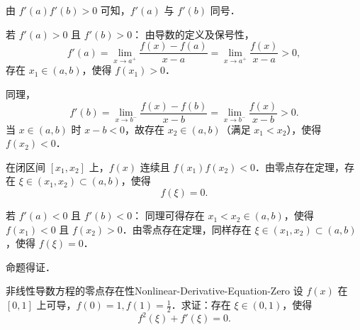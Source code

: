 \begin{myproof}
    由 $f'(a)f'(b) > 0$ 可知，$f'(a)$ 与 $f'(b)$ 同号．

    若 $f'(a) > 0$ 且 $f'(b) > 0$：
    由导数的定义及保号性，
    \begin{equation}
        f'(a) = \lim_{x\to a^+} \frac{f(x) - f(a)}{x - a} = \lim_{x\to a^+} \frac{f(x)}{x - a} > 0,
    \end{equation}
    存在 $x_1 \in (a, b)$，使得 $f(x_1) > 0$．

    同理，
    \begin{equation}
        f'(b) = \lim_{x\to b^-} \frac{f(x) - f(b)}{x - b} = \lim_{x\to b^-} \frac{f(x)}{x - b} > 0.
    \end{equation}
    当 $x \in (a, b)$ 时 $x - b < 0$，故存在 $x_2 \in (a, b)$（满足 $x_1 < x_2$），使得 $f(x_2) < 0$．

    在闭区间 $[x_1, x_2]$ 上，$f(x)$ 连续且 $f(x_1)f(x_2) < 0$．由零点存在定理，存在 $\xi \in (x_1, x_2) \subset (a, b)$，使得
    \begin{equation}
        f(\xi) = 0.
    \end{equation}

    若 $f'(a) < 0$ 且 $f'(b) < 0$：
    同理可得存在 $x_1 < x_2 \in (a, b)$，使得 $f(x_1) < 0$ 且 $f(x_2) > 0$．由零点存在定理，同样存在 $\xi \in (x_1, x_2) \subset (a, b)$，使得 $f(\xi) = 0$．

    命题得证．
\end{myproof}

\begin{problem}{非线性导数方程的零点存在性}{Nonlinear-Derivative-Equation-Zero}
    设 $f(x)$ 在 $[0, 1]$ 上可导，$f(0) = 1, f(1) = \frac{1}{2}$．求证：存在 $\xi \in (0, 1)$，使得
    \begin{equation}
        f^2(\xi) + f'(\xi) = 0.
    \end{equation}
\end{problem}

